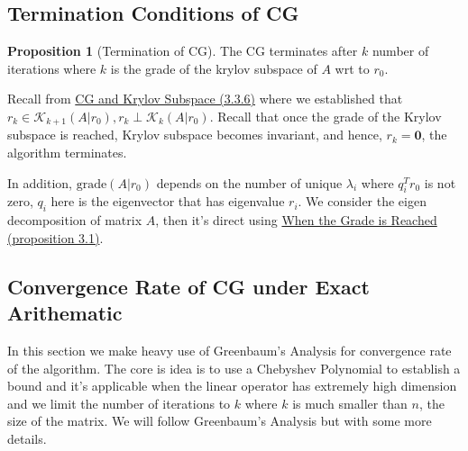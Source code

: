 \documentclass[]{article}
\theoremstyle{definition}
\newtheorem{prop}{Proposition}[section]  %
\begin{document}
    \subsection{Termination Conditions of CG}
        \begin{prop}[Termination of CG]
            The CG terminates after $k$ number of iterations where $k$ is the grade of the krylov subspace of $A$ wrt to $r_0$. 
        \end{prop}
        Recall from \hyperref[sec:CG_and_Krylov_Subspace]{CG and Krylov Subspace (3.3.6)} where we established that $r_k\in \mathcal K_{k + 1}(A|r_0), r_k \perp \mathcal K_{k}(A|r_0)$. Recall that once the grade of the Krylov subspace is reached, Krylov subspace becomes invariant, and hence, $r_k = \mathbf 0$, the algorithm terminates. 
        \par
        In addition, $\text{grade}(A|r_0)$ depends on the number of unique $\lambda_i$ where $q_i^Tr_0$ is not zero, $q_i$ here is the eigenvector that has eigenvalue $r_i$. We consider the eigen decomposition of matrix $A$, then it's direct using \hyperref[prop:When_the_Grade_is_Reached]{When the Grade is Reached (proposition 3.1)}. 


    \subsection{Convergence Rate of CG under Exact Arithematic}
        In this section we make heavy use of Greenbaum's Analysis for convergence rate of the algorithm. The core is idea is to use a Chebyshev Polynomial to establish a bound and it's applicable when the linear operator has extremely high dimension and we limit the number of iterations to $k$ where $k$ is much smaller than $n$, the size of the matrix. We will follow Greenbaum's Analysis but with some more details. 
\end{document}
